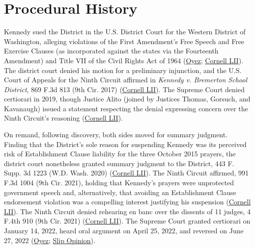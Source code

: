 \documentclass[12pt]{article}
\begin{document}
\section{Procedural History}
Kennedy sued the District in the U.S. District Court for the Western District of Washington, alleging violations of the First Amendment's Free Speech and Free Exercise Clauses (as incorporated against the states via the Fourteenth Amendment) and Title VII of the Civil Rights Act of 1964 (\href{https://www.oyez.org/cases/2021/21-418}{Oyez}; \href{https://www.law.cornell.edu/supremecourt/text/21-418}{Cornell LII}). The district court denied his motion for a preliminary injunction, and the U.S. Court of Appeals for the Ninth Circuit affirmed in \textit{Kennedy v. Bremerton School District}, 869 F.3d 813 (9th Cir. 2017) (\href{https://www.law.cornell.edu/supremecourt/text/21-418}{Cornell LII}). The Supreme Court denied certiorari in 2019, though Justice Alito (joined by Justices Thomas, Gorsuch, and Kavanaugh) issued a statement respecting the denial expressing concern over the Ninth Circuit's reasoning (\href{https://www.law.cornell.edu/supremecourt/text/21-418}{Cornell LII}).

On remand, following discovery, both sides moved for summary judgment. Finding that the District's sole reason for suspending Kennedy was its perceived risk of Establishment Clause liability for the three October 2015 prayers, the district court nonetheless granted summary judgment to the District, 443 F. Supp. 3d 1223 (W.D. Wash. 2020) (\href{https://www.law.cornell.edu/supremecourt/text/21-418}{Cornell LII}). The Ninth Circuit affirmed, 991 F.3d 1004 (9th Cir. 2021), holding that Kennedy's prayers were unprotected government speech and, alternatively, that avoiding an Establishment Clause endorsement violation was a compelling interest justifying his suspension (\href{https://www.law.cornell.edu/supremecourt/text/21-418}{Cornell LII}). The Ninth Circuit denied rehearing en banc over the dissents of 11 judges, 4 F.4th 910 (9th Cir. 2021) (\href{https://www.law.cornell.edu/supremecourt/text/21-418}{Cornell LII}). The Supreme Court granted certiorari on January 14, 2022, heard oral argument on April 25, 2022, and reversed on June 27, 2022 (\href{https://www.oyez.org/cases/2021/21-418}{Oyez}; \href{https://www.supremecourt.gov/opinions/21pdf/21-418_i425.pdf}{Slip Opinion}).
\end{document}
